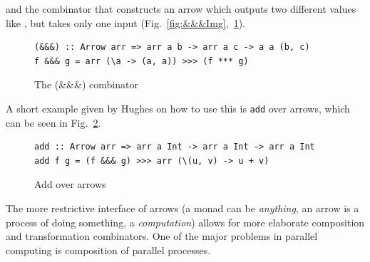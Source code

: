 and the \code{\&\&\&} combinator that constructs an arrow which outputs two different values like \code{***}, but takes only one input (Fig.~\ref{fig:&&&Img},~\ref{fig:&&&}).
\begin{figure}[h]
\begin{lstlisting}[frame=htrbl]
(&&&) :: Arrow arr => arr a b -> arr a c -> a a (b, c)
f &&& g = arr (\a -> (a, a)) >>> (f *** g)
\end{lstlisting}
\caption{The (\&\&\&) combinator}
\label{fig:&&&}
\end{figure}
A short example given by Hughes on how to use this is \lstinline{add} over arrows, which can be seen in Fig.~\ref{fig:addArrows}.
\begin{figure}[h]
\begin{lstlisting}[frame=htrbl]
add :: Arrow arr => arr a Int -> arr a Int -> arr a Int
add f g = (f &&& g) >>> arr (\(u, v) -> u + v)
\end{lstlisting}
\caption{Add over arrows}
\label{fig:addArrows}
\end{figure}
%

The more restrictive interface of arrows (a monad can be \emph{anything}, an arrow is a process of doing something, a \emph{computation}) allows for more elaborate composition and transformation combinators. One of the major problems in parallel computing is composition of parallel processes.


